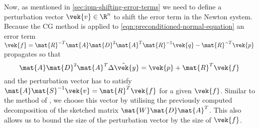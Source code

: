 Now, as mentioned in \cref{sec:ipm-shifting-error-terms} we need to define a perturbation vector \(\vek{v} \in \R^n\) to shift the error term in the Newton system.
Because the CG method is applied to \cref{eqn:preconditioned-normal-equation} an error term \(\vek{f} = \mat{R}^{-T}\mat{A}\mat{D}^2\mat{A}^T\mat{R}^{-1}\vek{q} - \mat{R}^{-T}\vek{p}\) propagates so that
\begin{equation}
  \mat{A} \mat{D}^2 \mat{A}^T \hat{\Delta\vek{y}} = \vek{p} + \mat{R}^T\vek{f}
\end{equation}
and the perturbation vector has to satisfy \(\mat{A}\mat{S}^{-1}\vek{v} = \mat{R}^T \vek{f}\) for a given \(\vek{f}\).
Similar to the method of \textcite{Avron-FasterRandomizedInfeasibleIPMs}, we choose this vector by utilising the previously computed decomposition of the sketched matrix \(\mat{W}\mat{D}\mat{A}^T\).
This also allows us to bound the size of the perturbation vector by the size of \(\vek{f}\).

